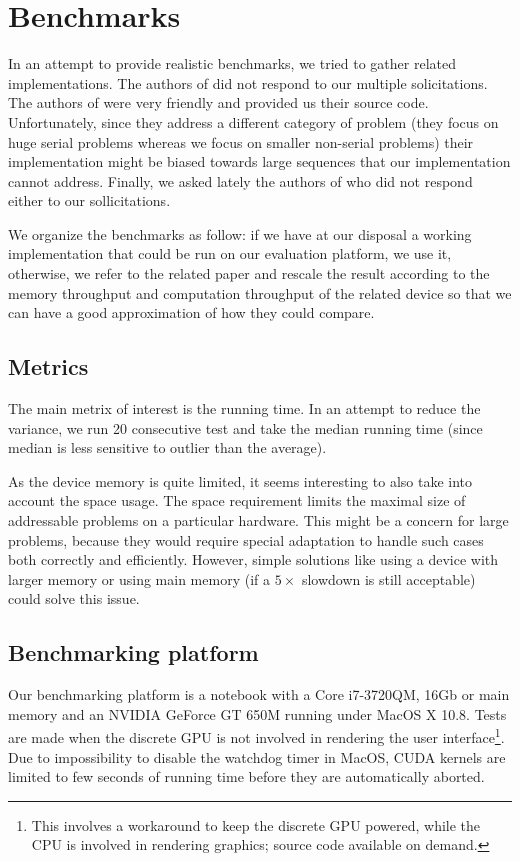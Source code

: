 \section{Benchmarks} \label{benchmarks}
In an attempt to provide realistic benchmarks, we tried to gather related implementations. The authors of \cite{gpu_atlp} did not respond to our multiple solicitations. The authors of \cite{swat_mega} were very friendly and provided us their source code. Unfortunately, since they address a different category of problem (they focus on huge serial problems whereas we focus on smaller non-serial problems) their implementation might be biased towards large sequences that our implementation cannot address. Finally, we asked lately the authors of \cite{gpu_rnafold} who did not respond either to our sollicitations.

We organize the benchmarks as follow: if we have at our disposal a working implementation that could be run on our evaluation platform, we use it, otherwise, we refer to the related paper and rescale the result according to the memory throughput and computation throughput of the related device so that we can have a good approximation of how they could compare.

\subsection{Metrics}
The main metrix of interest is the running time. In an attempt to reduce the variance, we run 20 consecutive test and take the median running time (since median is less sensitive to outlier than the average).

As the device memory is quite limited, it seems interesting to also take into account the space usage. The space requirement limits the maximal size of addressable problems  on a particular hardware. This might be a concern for large problems, because they would require special adaptation to handle such cases both correctly and efficiently. However, simple solutions like using a device with larger memory or using main memory (if a $5\times$ slowdown is still acceptable) could solve this issue.

\subsection{Benchmarking platform}
Our benchmarking platform is a notebook with a Core i7-3720QM, 16Gb or main memory and an NVIDIA GeForce GT 650M running under MacOS X 10.8. Tests are made when the discrete GPU is not involved in rendering the user interface\footnote{This involves a workaround to keep the discrete GPU powered, while the CPU is involved in rendering graphics; source code available on demand.}. Due to impossibility to disable the watchdog timer in MacOS, CUDA kernels are limited to few seconds of running time before they are automatically aborted.

